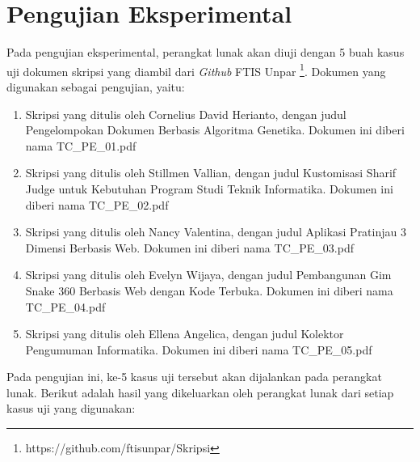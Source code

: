 \section{Pengujian Eksperimental}
Pada pengujian eksperimental, perangkat lunak akan diuji dengan 5 buah kasus uji dokumen skripsi yang diambil dari \textit{Github} FTIS Unpar \footnote{https://github.com/ftisunpar/Skripsi}. Dokumen yang digunakan sebagai pengujian, yaitu:

\begin{enumerate}
	\item Skripsi yang ditulis oleh Cornelius David Herianto, dengan judul Pengelompokan Dokumen Berbasis Algoritma Genetika. Dokumen ini diberi nama TC\_PE\_01.pdf~\cite{pe01}
	
	\item Skripsi yang ditulis oleh Stillmen Vallian, dengan judul Kustomisasi Sharif Judge untuk Kebutuhan Program Studi Teknik Informatika. Dokumen ini diberi nama TC\_PE\_02.pdf~\cite{pe02}
	
	\item Skripsi yang ditulis oleh Nancy Valentina, dengan judul Aplikasi Pratinjau 3 Dimensi Berbasis Web. Dokumen ini diberi nama TC\_PE\_03.pdf~\cite{pe03}
	
	\item Skripsi yang ditulis oleh Evelyn Wijaya, dengan judul Pembangunan Gim Snake 360 Berbasis Web dengan Kode Terbuka. Dokumen ini diberi nama TC\_PE\_04.pdf~\cite{pe04}
	
	\item Skripsi yang ditulis oleh Ellena Angelica, dengan judul Kolektor Pengumuman Informatika. Dokumen ini diberi nama TC\_PE\_05.pdf~\cite{pe05} 
	
\end{enumerate}

Pada pengujian ini, ke-5 kasus uji tersebut akan dijalankan pada perangkat lunak. Berikut adalah hasil yang dikeluarkan oleh perangkat lunak dari setiap kasus uji yang digunakan:

